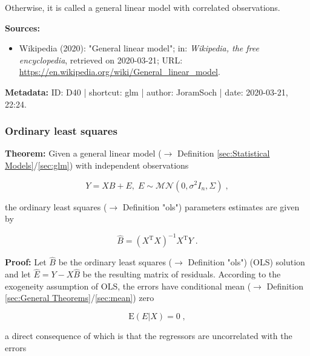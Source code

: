 \documentclass[a4paper,12pt,twoside]{book}
\begin{document}
Otherwise, it is called a general linear model with correlated observations.


\vspace{1em}
\textbf{Sources:}
\begin{itemize}
\item Wikipedia (2020): "General linear model"; in: \textit{Wikipedia, the free encyclopedia}, retrieved on 2020-03-21; URL: \url{https://en.wikipedia.org/wiki/General_linear_model}.
\end{itemize}


\vspace{1em}
\textbf{Metadata:} ID: D40 | shortcut: glm | author: JoramSoch | date: 2020-03-21, 22:24.
\vspace{1em}



\subsubsection[\textbf{Ordinary least squares}]{Ordinary least squares} \label{sec:glm-ols}
\setcounter{equation}{0}

\textbf{Theorem:} Given a general linear model ($\rightarrow$ Definition \ref{sec:Statistical Models}/\ref{sec:glm}) with independent observations

\begin{equation} \label{eq:glm-ols-GLM}
Y = X B + E, \; E \sim \mathcal{MN}(0, \sigma^2 I_n, \Sigma) \; ,
\end{equation}

the ordinary least squares ($\rightarrow$ Definition "ols") parameters estimates are given by

\begin{equation} \label{eq:glm-ols-OLS}
\hat{B} = (X^\mathrm{T} X)^{-1} X^\mathrm{T} Y \; .
\end{equation}


\vspace{1em}
\textbf{Proof:} Let $\hat{B}$ be the ordinary least squares ($\rightarrow$ Definition "ols") (OLS) solution and let $\hat{E} = Y - X\hat{B}$ be the resulting matrix of residuals. According to the exogeneity assumption of OLS, the errors have conditional mean ($\rightarrow$ Definition \ref{sec:General Theorems}/\ref{sec:mean}) zero

\begin{equation} \label{eq:glm-ols-OLS-exo}
\mathrm{E}(E|X) = 0 \; ,
\end{equation}

a direct consequence of which is that the regressors are uncorrelated with the errors
\end{document}
